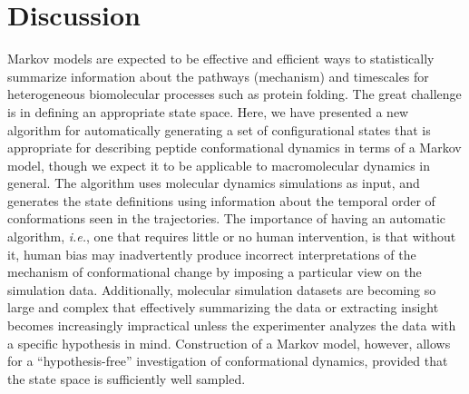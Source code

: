 
\section{Discussion}
\label{automatic:section:discussion}


Markov models are expected to be effective and efficient ways to statistically summarize information about the pathways (mechanism) and timescales for heterogeneous biomolecular processes such as protein folding.  
The great challenge is in defining an appropriate state space.  
Here, we have presented a new algorithm for automatically generating a set of configurational states that is appropriate for describing peptide conformational dynamics in terms of a Markov model, though we expect it to be applicable to macromolecular dynamics in general.  
The algorithm uses molecular dynamics simulations as input, and generates the state definitions using information about the temporal order of conformations seen in the trajectories.
The importance of having an automatic algorithm, \emph{i.e.}, one that requires little or no human intervention, is that without it, human bias may inadvertently produce incorrect interpretations of the mechanism of conformational change by imposing a particular view on the simulation data.
Additionally, molecular simulation datasets are becoming so large and complex that effectively summarizing the data or extracting insight becomes increasingly impractical unless the experimenter analyzes the data with a specific hypothesis in mind.
Construction of a Markov model, however, allows for a ``hypothesis-free'' investigation of conformational dynamics, provided that the state space is sufficiently well sampled.

